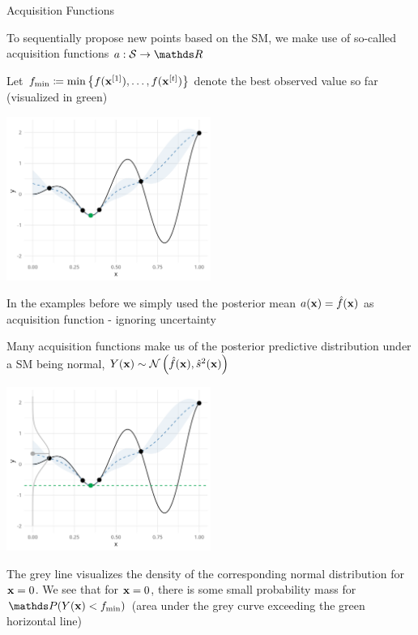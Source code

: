 \documentclass[11pt,compress,t,notes=noshow, xcolor=table]{beamer}
\begin{document}
\begin{vbframe}{Acquisition Functions}

To sequentially propose new points based on the SM, we make use of so-called acquisition functions $a: \mathcal{S} \to \R$\\

\vspace{1em}

Let $f_{\min} \coloneqq \min \left\{f(\mathbf{x}^{[1]}), \ldots, f(\mathbf{x}^{[t]})\right\}$ denote the best observed value so far (visualized in green)

\vspace*{-0.2cm}

\begin{center}
  \includegraphics[width = 0.5\textwidth]{figure_man/bayesian_loop_2.png}
\end{center}

\vspace*{-0.3cm}

In the examples before we simply used the posterior mean $a(\mathbf{x}) = \hat{f}(\mathbf{x})$ as acquisition function - ignoring uncertainty

\framebreak

Many acquisition functions make us of the posterior predictive distribution under a SM being normal, $Y(\mathbf{x}) \sim \mathcal{N}\left(\hat{f}(\mathbf{x}), \hat{s}^2(\mathbf{x})\right)$

\vspace*{-0.2cm}

\begin{center}
  \includegraphics[width = 0.5\textwidth]{figure_man/bayesian_loop_3.png}
\end{center}

\begin{footnotesize}   
The grey line visualizes the density of the corresponding normal distribution for $\mathbf{x} = 0$.
We see that for $\mathbf{x} = 0$, there is some small probability mass for $\P(Y(\xv) < \fmin)$ (area under the grey curve exceeding the green horizontal line)
\end{footnotesize}

\end{vbframe}
\end{document}
